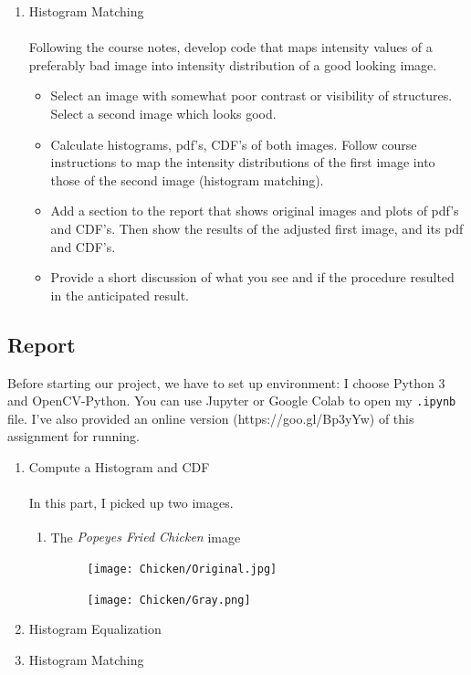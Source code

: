 \documentclass{article}
\begin{document}
\begin{enumerate}[label=B\arabic*)]
	\item Histogram Matching
		\\
		\\
		Following the course notes, develop code that maps intensity values of a preferably bad image into intensity distribution of a good looking image.
		\begin{itemize}
			\item Select an image with somewhat poor contrast or visibility of structures. Select a second image which looks good.
			\item Calculate histograms, pdf’s, CDF’s of both images. Follow course instructions to map the intensity distributions of the first image into those of the second image (histogram matching).
			\item Add a section to the report that shows original images and plots of pdf’s and CDF’s. Then show the results of the adjusted first image, and its pdf and CDF’s.
			\item Provide a short discussion of what you see and if the procedure resulted in the anticipated result.
		\end{itemize}		
\end{enumerate}

\pagebreak

\subsection{Report}
Before starting our project, we have to set up environment: I choose Python 3 and OpenCV-Python. You can use Jupyter or Google Colab to open my \texttt{.ipynb} file. I've also provided an online version (https://goo.gl/Bp3yYw) of this assignment for running.

\begin{enumerate}[label=B\arabic*)]
	\item Compute a Histogram and CDF 
		\\
		\\
		In this part, I picked up two images.
		\begin{enumerate}[label=\arabic*)]
			\item The \textit{Popeyes\textsuperscript{\tiny\textregistered} Fried Chicken} image %
				\begin{figure}[h!]
				\begin{minipage}{0.48\textwidth}
					\centering
					\texttt{[image: Chicken/Original.jpg]}
				\end{minipage}
				\hfill
				\begin{minipage}{0.48\textwidth}
					\centering
					\texttt{[image: Chicken/Gray.png]}
				\end{minipage}
		\end{figure}

		\end{enumerate}
		
	\item Histogram Equalization 
				
	\item Histogram Matching
		
\end{enumerate}
\end{document}
